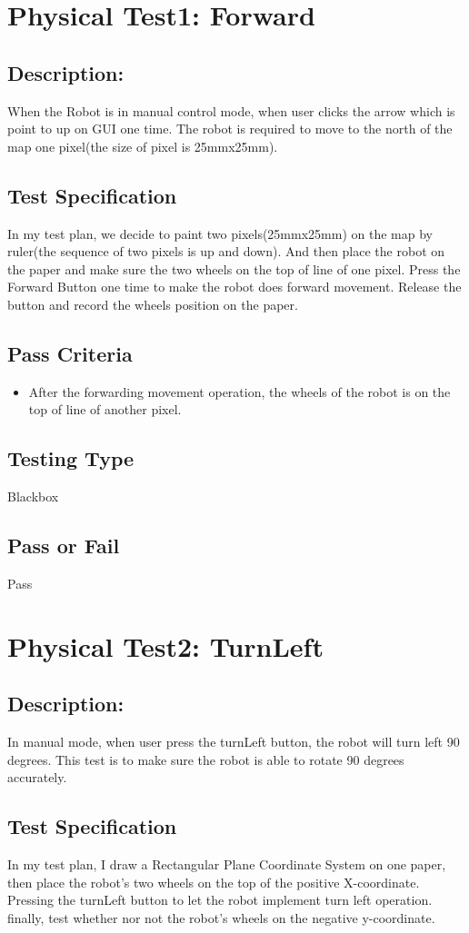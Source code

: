 \documentclass[11pt, a4paper]{report}
\begin{document}
\section{Physical Test1: Forward}
\subsection{Description:}
When the Robot is in manual control mode, when user clicks the arrow which is point to up on GUI one time. The robot is required to move to the north of the map one pixel(the size of pixel is 25mmx25mm).
\subsection{Test Specification}
In my test plan, we decide to paint two pixels(25mmx25mm) on the map by ruler(the sequence of two pixels is up and down). And then place the robot on the paper and make sure the two wheels on the top of line of one pixel. Press the Forward Button one time to make the robot does forward movement. Release the button and record the wheels position on the paper. 
\subsection{Pass Criteria}
\begin{itemize}
\item After the forwarding movement operation, the wheels of the robot is on the top of line of another pixel. 
\end{itemize}
\subsection{Testing Type}
Blackbox
\subsection{Pass or Fail}
Pass
\section{Physical Test2: TurnLeft}
\subsection{Description:}
In manual mode, when user press the turnLeft button, the robot will turn left 90 degrees. This test is to make sure the robot is able to rotate 90 degrees accurately.
\subsection{Test Specification}
In my test plan, I draw a Rectangular Plane Coordinate System on one paper, then place the robot's two wheels on the top of the positive X-coordinate. Pressing the turnLeft button to let the robot implement turn left operation. finally, test whether nor not the robot's wheels on the negative y-coordinate.
\end{document}
